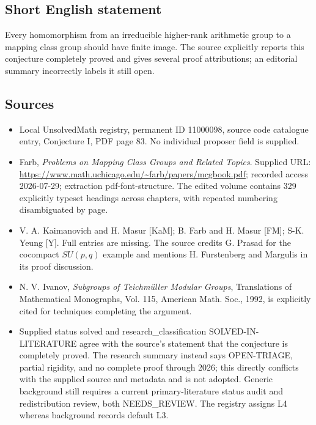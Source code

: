 \documentclass[11pt]{article}
\begin{document}
\subsection{Short English statement}
Every homomorphism from an irreducible higher-rank arithmetic group to a mapping class group should have finite image. The source explicitly reports this conjecture completely proved and gives several proof attributions; an editorial summary incorrectly labels it still open.
\subsection{Sources}
\begin{itemize}
\item Local UnsolvedMath registry, permanent ID 11000098, source code catalogue entry, Conjecture I, PDF page 83. No individual proposer field is supplied.
\item Farb, \emph{Problems on Mapping Class Groups and Related Topics}. Supplied URL: \url{https://www.math.uchicago.edu/~farb/papers/mcgbook.pdf}; recorded access 2026-07-29; extraction pdf-font-structure. The edited volume contains 329 explicitly typeset headings across chapters, with repeated numbering disambiguated by page.
\item V. A. Kaimanovich and H. Masur [KaM]; B. Farb and H. Masur [FM]; S-K. Yeung [Y]. Full entries are missing. The source credits G. Prasad for the cocompact \(SU(p,q)\) example and mentions H. Furstenberg and Margulis in its proof discussion.
\item N. V. Ivanov, \emph{Subgroups of Teichm\"uller Modular Groups}, Translations of Mathematical Monographs, Vol. 115, American Math. Soc., 1992, is explicitly cited for techniques completing the argument.
\item Supplied status solved and research\_classification SOLVED-IN-LITERATURE agree with the source's statement that the conjecture is completely proved. The research summary instead says OPEN-TRIAGE, partial rigidity, and no complete proof through 2026; this directly conflicts with the supplied source and metadata and is not adopted. Generic background still requires a current primary-literature status audit and redistribution review, both NEEDS\_REVIEW. The registry assigns L4 whereas background records default L3.
\end{itemize}
\end{document}
